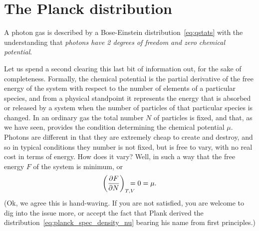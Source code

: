 \section{The Planck distribution}
\label{sec:planck_distribution}

A photon gas is described by a Bose-Einstein distribution~\eqref{eq:qstats} with the
understanding that \emph{photons have 2 degrees of freedom and zero chemical potential}.

Let us spend a second clearing this last bit of information out, for the sake of
completeness. Formally, the chemical potential is the partial derivative of the
free energy of the system with respect to the number of elements of a particular
species, and from a physical standpoint it represents the energy that is absorbed
or released by a system when the number of particles of that particular species
is changed. In an ordinary gas the total number $N$ of particles is fixed, and that,
as we have seen, provides the condition determining the chemical potential $\mu$.
Photons are different in that they are extremely cheap to create and
destroy, and so in typical
conditions they number is not fixed, but is free to vary, with no real cost in terms
of energy. How does it vary? Well, in such a way that the free energy $F$ of the
system is minimum, or
\begin{align*}
  \left(\pdv{F}{N}\right)_{T, V} \!\!\!\!\!\! = 0 = \mu.
\end{align*}
(Ok, we agree this is hand-waving. If you are not satisfied, you are welcome to
dig into the issue more, or accept the fact that Plank derived the
distribution~\eqref{eq:planck_spec_density_nu} bearing his name from first principles.)

